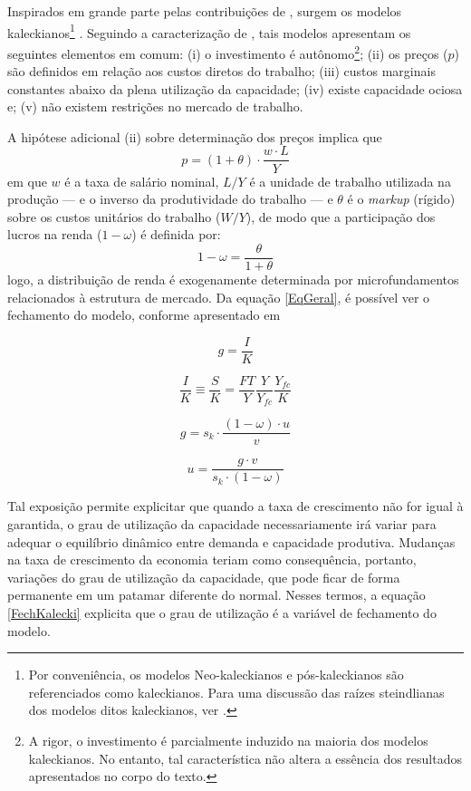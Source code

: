 Inspirados em grande parte pelas contribuições de \textcite{steindl_stagnation_1979}, surgem os modelos kaleckianos\footnote{Por conveniência, os modelos Neo-kaleckianos e pós-kaleckianos são referenciados como kaleckianos. Para uma discussão das raízes steindlianas dos modelos ditos kaleckianos, ver \textcite{santiago_uma_2008}.
} \cites{rowthorn_demand_1981}{dutt_stagnation_1984}{taylor_stagnationist_1985}{amadeo_role_1986}{bhaduri_unemployment_1990}. Seguindo a caracterização de \textcite[p.~790]{lavoie_kaleckian_1995}, tais modelos apresentam os seguintes elementos em comum: (i) o investimento é autônomo\footnote{
	A rigor, o investimento é parcialmente induzido na maioria dos modelos kaleckianos. No entanto, tal característica não altera  a essência dos resultados apresentados no corpo do texto.
}; (ii) os preços ($p$) são definidos em relação aos custos diretos do trabalho; (iii) custos marginais constantes abaixo da plena utilização da capacidade; (iv) existe capacidade ociosa e; (v) não existem restrições no mercado de trabalho. 

A hipótese adicional (ii) sobre determinação dos preços implica que 
$$
p = (1+\theta)\cdot \frac{w\cdot L}{Y}
$$
em que $w$ é a taxa de salário nominal, $L/Y$ é a unidade de trabalho utilizada na produção --- e o inverso da produtividade do trabalho --- e $\theta$ é o \textit{markup} (rígido) sobre os custos unitários do trabalho ($W/Y$),  de modo que a participação dos lucros na renda ($1-\omega$) é definida por:
$$
1 - \omega = \frac{\theta}{1+\theta}
$$
logo, a distribuição de renda é exogenamente determinada por microfundamentos relacionados à estrutura de mercado. 
Da equação \ref{EqGeral}, é possível ver o fechamento do modelo, conforme apresentado em \textcite{serrano_trouble_2017}

$$
g = \frac{I}{K}
$$

$$
\frac{I}{K} \equiv \frac{S}{K} =  \frac{FT}{Y}\frac{Y}{Y_{fc}}\frac{Y_{fc}}{K}
$$

$$
g = s_k\cdot \frac{(1-\omega)\cdot u}{ v}
$$

\begin{equation}
\label{FechKalecki}
u = \frac{g\cdot v}{s_k\cdot (1-\omega)}
\end{equation}

Tal exposição permite explicitar que quando a taxa de crescimento não for igual à garantida, o grau de utilização da capacidade necessariamente irá variar para adequar o equilíbrio dinâmico entre demanda e capacidade produtiva.
Mudanças na taxa de crescimento da economia teriam como consequência, portanto, variações do grau de utilização da capacidade, que pode ficar de forma permanente em um patamar diferente do normal.
Nesses termos, a equação \ref{FechKalecki} explicita que o grau de utilização é a variável de fechamento do modelo.

